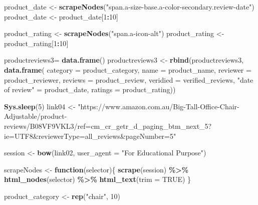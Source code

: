 \documentclass[
]{article}
\newenvironment{Shaded}{\begin{snugshade}}{\end{snugshade}}
\newcommand{\AttributeTok}[1]{\textcolor[rgb]{0.13,0.29,0.53}{#1}}
\newcommand{\ConstantTok}[1]{\textcolor[rgb]{0.56,0.35,0.01}{#1}}
\newcommand{\ControlFlowTok}[1]{\textcolor[rgb]{0.13,0.29,0.53}{\textbf{#1}}}
\newcommand{\DecValTok}[1]{\textcolor[rgb]{0.00,0.00,0.81}{#1}}
\newcommand{\FunctionTok}[1]{\textcolor[rgb]{0.13,0.29,0.53}{\textbf{#1}}}
\newcommand{\NormalTok}[1]{#1}
\newcommand{\OtherTok}[1]{\textcolor[rgb]{0.56,0.35,0.01}{#1}}
\newcommand{\SpecialCharTok}[1]{\textcolor[rgb]{0.81,0.36,0.00}{\textbf{#1}}}
\newcommand{\StringTok}[1]{\textcolor[rgb]{0.31,0.60,0.02}{#1}}
\begin{document}
\begin{Shaded}
\begin{Highlighting}[]
\NormalTok{  product\_date }\OtherTok{\textless{}{-}} \FunctionTok{scrapeNodes}\NormalTok{(}\StringTok{"span.a{-}size{-}base.a{-}color{-}secondary.review{-}date"}\NormalTok{)}
\NormalTok{  product\_date }\OtherTok{\textless{}{-}}\NormalTok{ product\_date[}\DecValTok{1}\SpecialCharTok{:}\DecValTok{10}\NormalTok{]}
  
\NormalTok{  product\_rating }\OtherTok{\textless{}{-}} \FunctionTok{scrapeNodes}\NormalTok{(}\StringTok{"span.a{-}icon{-}alt"}\NormalTok{)}
\NormalTok{  product\_rating }\OtherTok{\textless{}{-}}\NormalTok{ product\_rating[}\DecValTok{1}\SpecialCharTok{:}\DecValTok{10}\NormalTok{]}
  
\NormalTok{  productreviews3}\OtherTok{=} \FunctionTok{data.frame}\NormalTok{()}
\NormalTok{  productreviews3 }\OtherTok{\textless{}{-}} \FunctionTok{rbind}\NormalTok{(productreviews3, }\FunctionTok{data.frame}\NormalTok{(}
                      \AttributeTok{category =}\NormalTok{ product\_category,}
                      \AttributeTok{name =}\NormalTok{ product\_name,}
                      \AttributeTok{reviewer =}\NormalTok{ product\_reviewer,}
                      \AttributeTok{reviews =}\NormalTok{ product\_review,}
                      \AttributeTok{veridied =}\NormalTok{ verified\_reviews,}
                      \StringTok{"date of review"} \OtherTok{=}\NormalTok{ product\_date,}
                      \AttributeTok{ratings =}\NormalTok{ product\_rating))}
  
   \FunctionTok{Sys.sleep}\NormalTok{(}\DecValTok{5}\NormalTok{)}
\NormalTok{link04 }\OtherTok{\textless{}{-}} \StringTok{"https://www.amazon.com.au/Big{-}Tall{-}Office{-}Chair{-}Adjustable/product{-}reviews/B08VF9VKL3/ref=cm\_cr\_getr\_d\_paging\_btm\_next\_5?ie=UTF8\&reviewerType=all\_reviews\&pageNumber=5"}


\NormalTok{  session }\OtherTok{\textless{}{-}} \FunctionTok{bow}\NormalTok{(link02,}
               \AttributeTok{user\_agent =} \StringTok{"For Educational Purpose"}\NormalTok{)}

\NormalTok{  scrapeNodes }\OtherTok{\textless{}{-}} \ControlFlowTok{function}\NormalTok{(selector)\{}
    \FunctionTok{scrape}\NormalTok{(session) }\SpecialCharTok{\%\textgreater{}\%}
      \FunctionTok{html\_nodes}\NormalTok{(selector) }\SpecialCharTok{\%\textgreater{}\%}
      \FunctionTok{html\_text}\NormalTok{(}\AttributeTok{trim =} \ConstantTok{TRUE}\NormalTok{)}
\NormalTok{  \}}

\NormalTok{  product\_category }\OtherTok{\textless{}{-}} \FunctionTok{rep}\NormalTok{(}\StringTok{"chair"}\NormalTok{, }\DecValTok{10}\NormalTok{)}


\end{Highlighting}
\end{Shaded}
\end{document}
